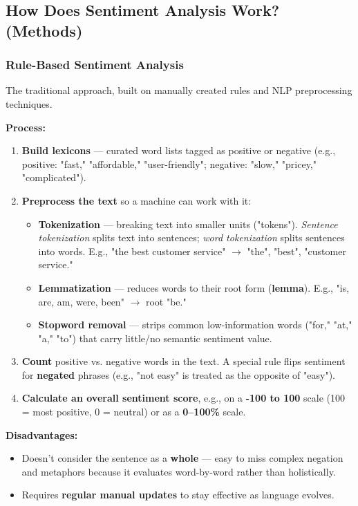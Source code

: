 \documentclass[12pt,openany]{book}
\begin{document}
\subsection{How Does Sentiment Analysis Work? (Methods)}

\subsubsection{Rule-Based Sentiment Analysis}

The traditional approach, built on manually created rules and NLP preprocessing techniques.

\textbf{Process:}
\begin{enumerate}[leftmargin=*]
    \item \textbf{Build lexicons} --- curated word lists tagged as positive or negative (e.g., positive: "fast," "affordable," "user-friendly"; negative: "slow," "pricey," "complicated").
    \item \textbf{Preprocess the text} so a machine can work with it:
    \begin{itemize}[leftmargin=*]
        \item \textbf{Tokenization} --- breaking text into smaller units ("tokens"). \textit{Sentence tokenization} splits text into sentences; \textit{word tokenization} splits sentences into words. E.g., "the best customer service" \(\rightarrow\) "the", "best", "customer service."
        \item \textbf{Lemmatization} --- reduces words to their root form (\textbf{lemma}). E.g., "is, are, am, were, been" \(\rightarrow\) root "be."
        \item \textbf{Stopword removal} --- strips common low-information words ("for," "at," "a," "to") that carry little/no semantic sentiment value.
    \end{itemize}
    \item \textbf{Count} positive vs. negative words in the text. A special rule flips sentiment for \textbf{negated} phrases (e.g., "not easy" is treated as the opposite of "easy").
    \item \textbf{Calculate an overall sentiment score}, e.g., on a \textbf{-100 to 100} scale (100 = most positive, 0 = neutral) or as a \textbf{0--100\%} scale.
\end{enumerate}

\textbf{Disadvantages:}
\begin{itemize}[leftmargin=*]
    \item Doesn't consider the sentence as a \textbf{whole} --- easy to miss complex negation and metaphors because it evaluates word-by-word rather than holistically.
    \item Requires \textbf{regular manual updates} to stay effective as language evolves.
\end{itemize}
\end{document}
